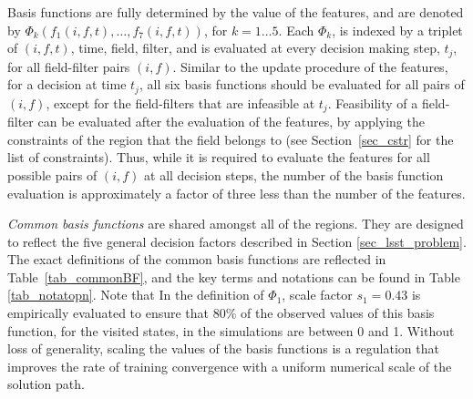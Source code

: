 \documentclass[12pt]{aastex62}
\theoremstyle{definition}
\begin{document}
Basis functions are fully determined by the value of the features, and are denoted by $\Phi_k(f_1(i,f,t),\dots, f_7(i,f,t))$, for $k = 1 \dots 5$. Each $\Phi_k$, is indexed by a triplet of $(i,f,t)$, time, field, filter, and is evaluated at every decision making step, $t_j$, for all field-filter pairs $(i,f)$. Similar to the update procedure of the features, for a decision at time $t_j$, all six basis functions should be evaluated for all pairs of $(i,f)$, except for the field-filters that are infeasible at $t_j$. Feasibility of a field-filter can be evaluated after the evaluation of the features, by applying the constraints of the region that the field belongs to (see Section~\ref{sec_cstr} for the list of constraints). Thus, while it is required to evaluate the features for all possible pairs of $(i,f)$ at all decision steps, the number of the basis function evaluation is approximately a factor of three less than the number of the features.

\textit{Common basis functions} are shared amongst all of the regions. They are designed to reflect the five general decision factors described in Section \ref{sec_lsst_problem}. The exact definitions of the common basis functions are reflected in Table~\ref{tab_commonBF}, and the key terms and notations can be found in Table \ref{tab_notatopn}. Note that In the definition of $\Phi_1$, scale factor $s_1= 0.43$ is empirically evaluated to ensure that 80\% of the observed values of this basis function, for the visited states, in the simulations are between 0 and 1. Without loss of generality, scaling the values of the basis functions is a regulation that improves the rate of training convergence with a uniform numerical scale of the solution path.
\end{document}
